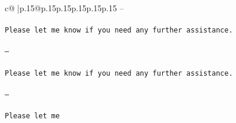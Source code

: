 \documentclass{article}
\begin{document}
{\begin{supertabular}{c@{$\;$}|p{.15\linewidth}@{}p{.15\linewidth}p{.15\linewidth}p{.15\linewidth}p{.15\linewidth}p{.15\linewidth}}
{{{--\\ \tt \\ \tt Please let me know if you need any further assistance. \\ \tt \\ \tt ---\\ \tt \\ \tt Please let me know if you need any further assistance. \\ \tt \\ \tt ---\\ \tt \\ \tt Please let me}}}
\end{supertabular}}
\end{document}
